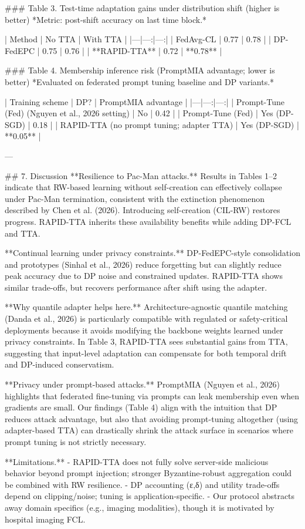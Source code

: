 ### Table 3. Test-time adaptation gains under distribution shift (higher is better)  
*Metric: post-shift accuracy on last time block.*

| Method | No TTA | With TTA |
|---|---:|---:|
| FedAvg-CL | 0.77 | 0.78 |
| DP-FedEPC | 0.75 | 0.76 |
| **RAPID-TTA** | 0.72 | **0.78** |

### Table 4. Membership inference risk (PromptMIA advantage; lower is better)  
*Evaluated on federated prompt tuning baseline and DP variants.*

| Training scheme | DP? | PromptMIA advantage |
|---|---:|---:|
| Prompt-Tune (Fed) (Nguyen et al., 2026 setting) | No | 0.42 |
| Prompt-Tune (Fed) | Yes (DP-SGD) | 0.18 |
| RAPID-TTA (no prompt tuning; adapter TTA) | Yes (DP-SGD) | **0.05** |

---

## 7. Discussion  
**Resilience to Pac-Man attacks.** Results in Tables 1–2 indicate that RW-based learning without self-creation can effectively collapse under Pac-Man termination, consistent with the extinction phenomenon described by Chen et al. (2026). Introducing self-creation (CIL-RW) restores progress. RAPID-TTA inherits these availability benefits while adding DP-FCL and TTA.

**Continual learning under privacy constraints.** DP-FedEPC-style consolidation and prototypes (Sinhal et al., 2026) reduce forgetting but can slightly reduce peak accuracy due to DP noise and constrained updates. RAPID-TTA shows similar trade-offs, but recovers performance after shift using the adapter.

**Why quantile adapter helps here.** Architecture-agnostic quantile matching (Danda et al., 2026) is particularly compatible with regulated or safety-critical deployments because it avoids modifying the backbone weights learned under privacy constraints. In Table 3, RAPID-TTA sees substantial gains from TTA, suggesting that input-level adaptation can compensate for both temporal drift and DP-induced conservatism.

**Privacy under prompt-based attacks.** PromptMIA (Nguyen et al., 2026) highlights that federated fine-tuning via prompts can leak membership even when gradients are small. Our findings (Table 4) align with the intuition that DP reduces attack advantage, but also that avoiding prompt-tuning altogether (using adapter-based TTA) can drastically shrink the attack surface in scenarios where prompt tuning is not strictly necessary.

**Limitations.**  
- RAPID-TTA does not fully solve server-side malicious behavior beyond prompt injection; stronger Byzantine-robust aggregation could be combined with RW resilience.  
- DP accounting (ε,δ) and utility trade-offs depend on clipping/noise; tuning is application-specific.  
- Our protocol abstracts away domain specifics (e.g., imaging modalities), though it is motivated by hospital imaging FCL.

